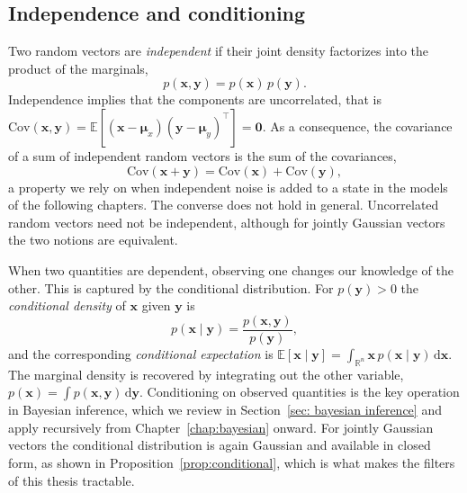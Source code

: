 \subsection{Independence and conditioning}
Two random vectors are \emph{independent} if their joint density factorizes into the product of the marginals,
\begin{equation}\label{eq:independence}
    p(\mathbf{x}, \mathbf{y}) = p(\mathbf{x})\, p(\mathbf{y}).
\end{equation}
Independence implies that the components are uncorrelated, that is $\mathrm{Cov}(\mathbf{x}, \mathbf{y}) = \mathbb{E}[(\mathbf{x} - \boldsymbol{\mu}_x)(\mathbf{y} - \boldsymbol{\mu}_y)^\top] = \mathbf{0}$. As a consequence, the covariance of a sum of independent random vectors is the sum of the covariances,
\begin{equation}\label{eq:cov_sum}
    \mathrm{Cov}(\mathbf{x} + \mathbf{y}) = \mathrm{Cov}(\mathbf{x}) + \mathrm{Cov}(\mathbf{y}),
\end{equation}
a property we rely on when independent noise is added to a state in the models of the following chapters. The converse does not hold in general. Uncorrelated random vectors need not be independent, although for jointly Gaussian vectors the two notions are equivalent. 

When two quantities are dependent, observing one changes our knowledge of the other. This is captured by the conditional distribution. For $p(\mathbf{y}) > 0$ the \emph{conditional density} of $\mathbf{x}$ given $\mathbf{y}$ is
\begin{equation}\label{eq:conditional_density}
    p(\mathbf{x} \mid \mathbf{y}) = \frac{p(\mathbf{x}, \mathbf{y})}{p(\mathbf{y})},
\end{equation}
and the corresponding \emph{conditional expectation} is $\mathbb{E}\left[\mathbf{x}\mid \mathbf{y}\right] = \int_{\mathbb{R}^n} \mathbf{x}\, p\left(\mathbf{x} \mid \mathbf{y}\right)\, \mathrm{d}\mathbf{x}$. The marginal density is recovered by integrating out the other variable, $p(\mathbf{x}) = \int p(\mathbf{x}, \mathbf{y})\, \mathrm{d}\mathbf{y}$. Conditioning on observed quantities is the key operation in Bayesian inference, which we review in Section~\ref{sec: bayesian inference} and apply recursively from Chapter~\ref{chap:bayesian} onward. For jointly Gaussian vectors the conditional distribution is again Gaussian and available in closed form, as shown in Proposition~\ref{prop:conditional}, which is what makes the filters of this thesis tractable.

